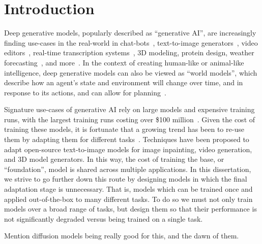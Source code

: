 \chapter{Introduction}
\label{ch:introduction}

Deep generative models, popularly described as ``generative AI'', are increasingly finding use-cases in the real-world in chat-bots~\cite{wolf2020transformers}, text-to-image generators~\cite{}, video editors~\cite{}, real-time transcription systems~\cite{}, 3D modeling, protein design, weather forecasting~\citep{lam2022graphcast}, and more~\cite{}. In the context of creating human-like or animal-like intelligence, deep generative models can also be viewed as ``world models'', which describe how an agent's state and environment will change over time, and in response to its actions, and can allow for planning~\citep{ha2018world}. 

Signature use-cases of generative AI rely on large models and expensive training runs, with the largest training runs costing over \$100 million~\cite{}. Given the cost of training these models, it is fortunate that a growing trend has been to re-use them by adapting them for different tasks~\citep{bommasani2021opportunities}. Techniques have been proposed to adapt open-source text-to-image models for image inpainting, video generation, and 3D model generators. In this way, the cost of training the base, or ``foundation'', model is shared across multiple applications. In this dissertation, we strive to go further down this route by designing models in which the final adaptation stage is unnecessary. That is, models which can be trained once and applied out-of-the-box to many different tasks. To do so we must not only train models over a broad range of tasks, but design them so that their performance is not significantly degraded versus being trained on a single task.

Mention diffusion models being really good for this, and the dawn of them.


